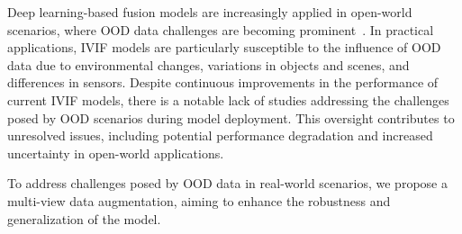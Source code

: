 Deep learning-based fusion models are increasingly applied in open-world scenarios, where OOD data challenges are becoming prominent~\cite{gawlikowski2023handling}. In practical applications, IVIF models are particularly susceptible to the influence of OOD data due to environmental changes, variations in objects and scenes, and differences in sensors. Despite continuous improvements in the performance of current IVIF models, there is a notable lack of studies addressing the challenges posed by OOD scenarios during model deployment. This oversight contributes to unresolved issues, including potential performance degradation and increased uncertainty in open-world applications.

To address challenges posed by OOD data in real-world scenarios, we propose a multi-view data augmentation, aiming to enhance the robustness and generalization of the model.